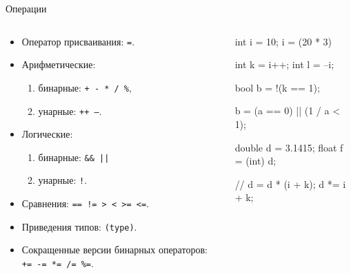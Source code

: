 \documentclass[9pt]{beamer}
\begin{document}
\begin{frame}[fragile]{Операции}
    \begin{columns}
        \begin{column}{0.5\textwidth}
            \begin{itemize}
                \item Оператор присваивания: \alert{\texttt{=}}.
                \item Арифметические: 
                \begin{enumerate}
                    \item бинарные: \alert{\texttt{+ - * / \%}},
                    \item унарные: \alert{\texttt{++ --}}.
                \end{enumerate}
                \item Логические:
                \begin{enumerate}
                    \item бинарные: \alert{\texttt{\&\& ||}}
                    \item унарные: \alert{\texttt{!}}.
                \end{enumerate}
                \item Сравнения: \alert{\texttt{== != > < >= <=}}.
                \item Приведения типов: \alert{\texttt{(type)}}.
                \item Сокращенные версии бинарных операторов: \alert{\texttt{+= -= *= /= \%=}}.
            \end{itemize}
        \end{column}
        \begin{column}{0.5\textwidth}  %
            \begin{cppcode}
                int i = 10;
                i = (20 * 3) %
                
                int k = i++;
                int l = --i;
                
                bool b = !(k == 1);
                
                b = (a == 0) || (1 / a < 1);
                
                double d = 3.1415;
                float f = (int) d;
                
                // d = d * (i + k);
                d *= i + k;
            \end{cppcode}
        \end{column}
    \end{columns}
\end{frame}
\end{document}
